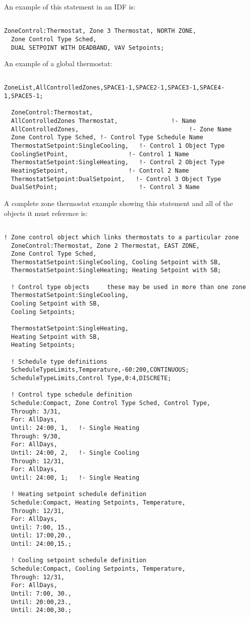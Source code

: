 An example of this statement in an IDF is:

\begin{lstlisting}

ZoneControl:Thermostat, Zone 3 Thermostat, NORTH ZONE,
  Zone Control Type Sched,
  DUAL SETPOINT WITH DEADBAND, VAV Setpoints;
\end{lstlisting}

An example of a global thermostat:

\begin{lstlisting}

ZoneList,AllControlledZones,SPACE1-1,SPACE2-1,SPACE3-1,SPACE4-1,SPACE5-1;

  ZoneControl:Thermostat,
  AllControlledZones Thermostat,               !- Name
  AllControlledZones,                               !- Zone Name
  Zone Control Type Sched, !- Control Type Schedule Name
  ThermostatSetpoint:SingleCooling,   !- Control 1 Object Type
  CoolingSetPoint,                 !- Control 1 Name
  ThermostatSetpoint:SingleHeating,   !- Control 2 Object Type
  HeatingSetpoint,                 !- Control 2 Name
  ThermostatSetpoint:DualSetpoint,   !- Control 3 Object Type
  DualSetPoint;                       !- Control 3 Name
\end{lstlisting}

A complete zone thermostat example showing this statement and all of the objects it must reference is:

\begin{lstlisting}

! Zone control object which links thermostats to a particular zone
  ZoneControl:Thermostat, Zone 2 Thermostat, EAST ZONE,
  Zone Control Type Sched,
  ThermostatSetpoint:SingleCooling, Cooling Setpoint with SB,
  ThermostatSetpoint:SingleHeating; Heating Setpoint with SB;

  ! Control type objects     these may be used in more than one zone
  ThermostatSetpoint:SingleCooling,
  Cooling Setpoint with SB,
  Cooling Setpoints;

  ThermostatSetpoint:SingleHeating,
  Heating Setpoint with SB,
  Heating Setpoints;

  ! Schedule type definitions
  ScheduleTypeLimits,Temperature,-60:200,CONTINUOUS;
  ScheduleTypeLimits,Control Type,0:4,DISCRETE;

  ! Control type schedule definition
  Schedule:Compact, Zone Control Type Sched, Control Type,
  Through: 3/31,
  For: AllDays,
  Until: 24:00, 1,   !- Single Heating
  Through: 9/30,
  For: AllDays,
  Until: 24:00, 2,   !- Single Cooling
  Through: 12/31,
  For: AllDays,
  Until: 24:00, 1;   !- Single Heating

  ! Heating setpoint schedule definition
  Schedule:Compact, Heating Setpoints, Temperature,
  Through: 12/31,
  For: AllDays,
  Until: 7:00, 15.,
  Until: 17:00,20.,
  Until: 24:00,15.;

  ! Cooling setpoint schedule definition
  Schedule:Compact, Cooling Setpoints, Temperature,
  Through: 12/31,
  For: AllDays,
  Until: 7:00, 30.,
  Until: 20:00,23.,
  Until: 24:00,30.;
\end{lstlisting}

